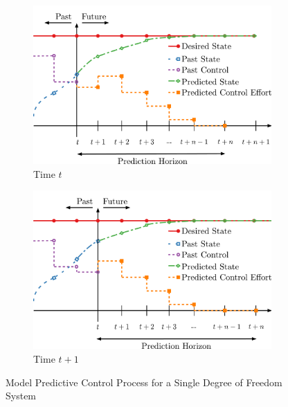 \documentclass[letterpaper, 12 pt, conference]{ieeeconf}
\begin{document}
\begin{figure}[tb]
  \centering
  \begin{subfigure}{\columnwidth}
  \centering
  \includegraphics[width=\columnwidth]{Figures/MPC_theory.pdf}
  \caption{Time $t$}
  \label{fig:MPC_vanilla_t0}
  \end{subfigure}
  \vspace{0.05in}
  \begin{subfigure}{\columnwidth}
  \centering
  \includegraphics[width=\columnwidth]{Figures/MPC_theory_tp1.pdf}
  \caption{Time $t+1$}
  \label{fig:MPC_vanilla_tp1}
  \end{subfigure}
  \caption{Model Predictive Control Process for a Single Degree of Freedom System}
  \label{fig:MPC_vanilla}
\end{figure}
%
\end{document}
